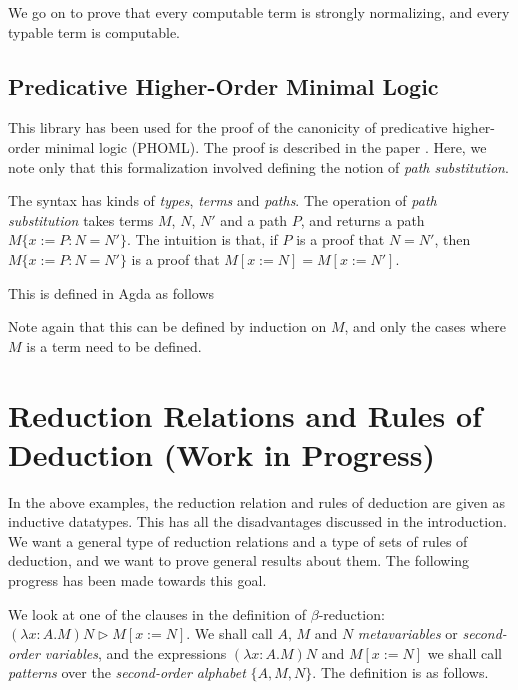 \documentclass[envcountsame]{llncs}
\begin{document}
We go on to prove that every computable term is strongly normalizing, and every typable term is computable.

\subsection{Predicative Higher-Order Minimal Logic}

This library has been used for the proof of the canonicity of predicative higher-order minimal logic (PHOML).  The proof is described in the paper \cite{DBLP:journals/corr/AdamsBC16}.  
Here, we note only that this formalization involved defining the notion of \emph{path substitution}.

The syntax has kinds of \emph{types}, \emph{terms} and \emph{paths}.  The operation of \emph{path substitution} takes terms $M$, $N$, $N'$ and a path $P$, and
returns a path $M \{ x := P : N = N' \}$.  The intuition is that, if $P$ is a proof that $N = N'$, then $M \{ x := P : N = N' \}$ is a proof that
$M[x:=N] = M[x:=N']$.

This is defined in Agda as follows


Note again that this can be defined by induction on $M$, and only the cases where $M$ is a term need to be defined.

\section{Reduction Relations and Rules of Deduction (Work in Progress)}

In the above examples, the reduction relation and rules of deduction are given as inductive datatypes.  This has all the disadvantages discussed in the introduction.
We want a general type of reduction relations and a type of sets of rules of deduction, and we want to prove general results about them.  The following progress
has been made towards this goal.

We look at one of the clauses in the definition of $\beta$-reduction: $(\lambda x:A.M)N \rhd M [x:=N]$.  We shall call $A$, $M$ and $N$ \emph{metavariables}
or \emph{second-order variables}, and the expressions $(\lambda x:A.M)N$ and $M[x:=N]$ we shall call \emph{patterns} over the \emph{second-order alphabet} $\{ A, M, N \}$.
The definition is as follows.
\end{document}
